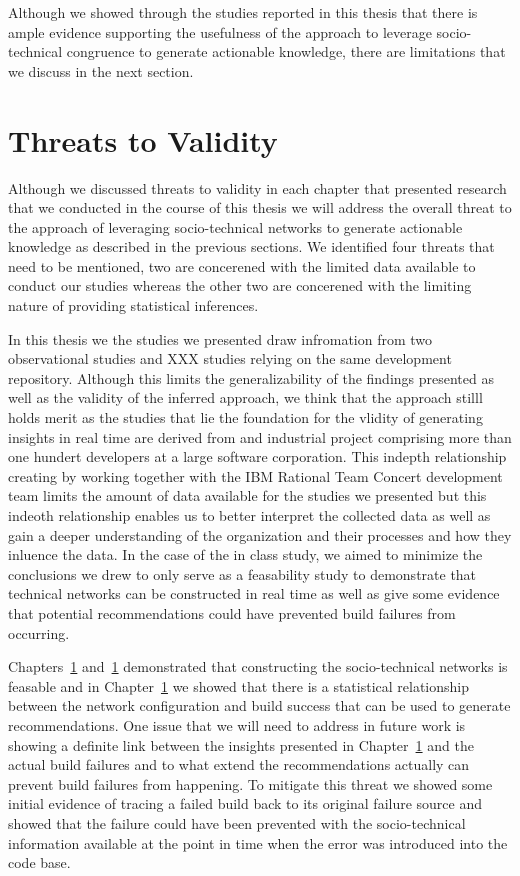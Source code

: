Although we showed through the studies reported in this thesis that there is ample evidence supporting the usefulness of the approach to leverage socio-technical congruence to generate actionable knowledge, there are limitations that we discuss in the next section.

\section{Threats to Validity}
Although we discussed threats to validity in each chapter that presented research that we conducted in the course of this thesis we will address the overall threat to the approach of leveraging socio-technical networks to generate actionable knowledge as described in the previous sections.
We identified four threats that need to be mentioned, two are concerened with the limited data available to conduct our studies whereas the other two are concerened with the limiting nature of providing statistical inferences.

In this thesis we the studies we presented draw infromation from two observational studies and XXX studies relying on the same development repository.
Although this limits the generalizability of the findings presented as well as the validity of the inferred approach, we think that the approach stilll holds merit as the studies that lie the foundation for the vlidity of generating insights in real time are derived from and industrial project comprising more than one hundert developers at a large software corporation.
This indepth relationship creating by working together with the IBM Rational Team Concert development team limits the amount of data available for the studies we presented but this indeoth relationship enables us to better interpret the collected data as well as gain a deeper understanding of the organization and their processes and how they inluence the data.
In the case of the in class study, we aimed to minimize the conclusions we drew to only serve as a feasability study to demonstrate that technical networks can be constructed in real time as well as give some evidence that potential recommendations could have prevented build failures from occurring.

Chapters~\ref{} and~\ref{} demonstrated that constructing the socio-technical networks is feasable and in Chapter~\ref{} we showed that there is a statistical relationship between the network configuration and build success that can be used to generate recommendations.
One issue that we will need to address in future work is showing a definite link between the insights presented in Chapter~\ref{} and the actual build failures and to what extend the recommendations actually can prevent build failures from happening.
To mitigate this threat we showed some initial evidence of tracing a failed build back to its original failure source and showed that the failure could have been prevented with the socio-technical information available at the point in time when the error was introduced into the code base.

